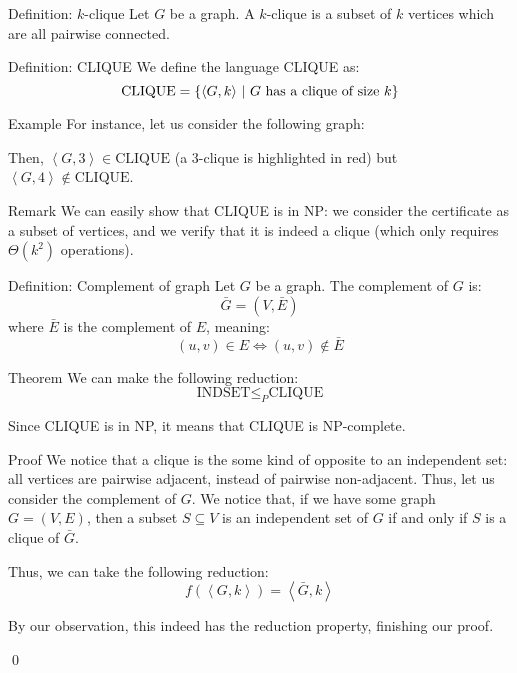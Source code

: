 \documentclass[a4paper]{article}
\begin{document}
\begin{parag}{Definition: $k$-clique}
    Let $G$ be a graph. A $k$-clique is a subset of $k$ vertices which are all pairwise connected.
\end{parag}

\begin{parag}{Definition: CLIQUE}
    We define the language CLIQUE as: 
    \[\text{CLIQUE} = \left\{\left\langle G, k \right\rangle \suchthat \text{$G$ has a clique of size $k$}\right\}\]

    \begin{subparag}{Example}
        For instance, let us consider the following graph: 
        
        Then, $\left\langle G, 3 \right\rangle \in \text{CLIQUE}$ (a $3$-clique is highlighted in red) but $\left\langle G, 4 \right\rangle \not \in \text{CLIQUE}$.
    \end{subparag}

    \begin{subparag}{Remark}
        We can easily show that CLIQUE is in NP: we consider the certificate as a subset of vertices, and we verify that it is indeed a clique (which only requires $\Theta\left(k^2\right)$ operations).
    \end{subparag}
    
\end{parag}

\begin{parag}{Definition: Complement of graph}
    Let $G$ be a graph. The complement of $G$ is:
    \[\bar{G} = \left(V, \bar{E}\right)\]
    where $\bar{E}$ is the complement of $E$, meaning:
    \[\left(u, v\right) \in E \iff \left(u, v\right) \not \in \bar{E}\]
\end{parag}


\begin{parag}{Theorem}
    We can make the following reduction: 
    \[\text{INDSET} \leq_P \text{CLIQUE}\]
    
    Since CLIQUE is in NP, it means that CLIQUE is NP-complete.

    \begin{subparag}{Proof}
        We notice that a clique is the some kind of opposite to an independent set: all vertices are pairwise adjacent, instead of pairwise non-adjacent. Thus, let us consider the complement of $G$. We notice that, if we have some graph $G = \left(V, E\right)$, then a subset $S \subseteq V$ is an independent set of $G$ if and only if $S$ is a clique of $\bar{G}$.

        Thus, we can take the following reduction: 
        \[f\left(\left\langle G, k \right\rangle\right) = \left\langle \bar{G}, k \right\rangle\]

        By our observation, this indeed has the reduction property, finishing our proof.

        \qed
    \end{subparag}
\end{parag}
\end{document}
